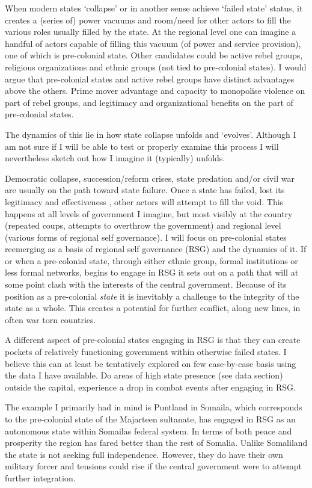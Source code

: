 \documentclass[12pt]{article}
\begin{document}
\begin{multicols}{2}
When modern states `collapse' or in another sense achieve `failed state' status,
it creates a (series of) power vacuums and room/need for other actors to fill
the various roles usually filled by the state. At the regional level one can
imagine a handful of actors capable of filling this vacuum (of power and
service provision), one of which is pre-colonial state. Other candidates could
be active rebel groups, religious organizations and ethnic groups (not tied to
pre-colonial states). I would argue that pre-colonial states and active rebel
groups have distinct advantages above the others. Prime mover advantage and
capacity to monopolise violence on part of rebel groups, and legitimacy and
organizational benefits on the part of pre-colonial states.

The dynamics of this lie in how state collapse unfolds and `evolves'. Although I
am not sure if I will be able to test or properly examine this process I will
nevertheless sketch out how I imagine it (typically) unfolds.

Democratic collapse, succession/reform crises, state predation and/or civil war
are usually on the path toward state failure\citep{Goldstone_2008}. Once a state
has failed, lost its legitimacy and effectiveness \citep{Goldstone_2008}, other
actors will attempt to fill the void. This happens at all levels of government I
imagine, but most visibly at the country (repeated coups, attempts to overthrow
the government) and regional level (various forms of regional self governance).
I will focus on pre-colonial states reemerging as a basis of regional self
governance  (RSG) and the dynamics of it. If or when a pre-colonial state,
through either ethnic group, formal institutions or less formal networks, begins
to engage in RSG it sets out on a path that will at some point clash with the
interests of the central government. Because of its position as a pre-colonial
\textit{state} it is inevitably a challenge to the integrity of the state as a
whole. This creates a potential for further conflict, along new lines, in often
war torn countries. 

A different aspect of pre-colonial states engaging in RSG is that they can
create pockets of relatively functioning government within otherwise failed
states. I believe this can at least be tentatively explored on few case-by-case
basis using the data I have available. Do areas of high state presence (see data
section) outside the capital, experience a drop in combat events after engaging
in RSG. 

The example I primarily had in mind is  Puntland in Somaila, which corresponds
to the pre-colonial state of the Majarteen sultanate, has engaged in RSG as an
autonomous state within Somailas federal system. In terms of both peace and
prosperity the region has fared better than the rest of Somalia. Unlike
Somaliland the state is not seeking full independence. However, they do have
their own military forcer and tensions could rise if the central government were
to attempt further integration.


\end{multicols}
\end{document}
